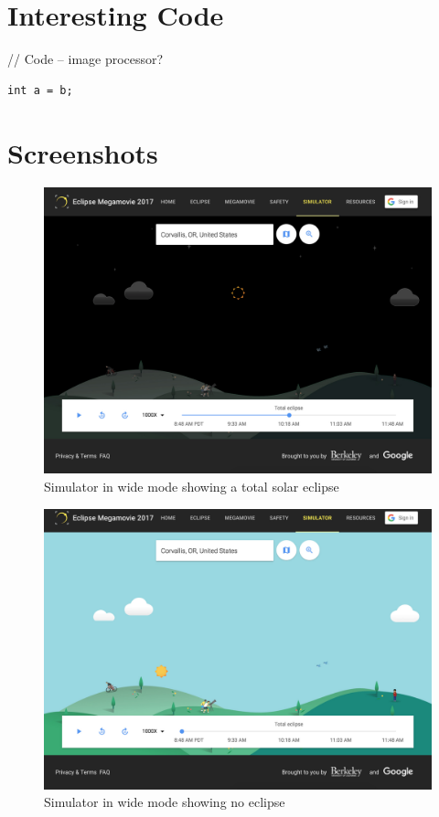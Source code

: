 \documentclass[10pt, onecolumn, draftclsnofoot, letterpaper, compsoc]{IEEEtran}
\begin{document}
\newpage
\section{Interesting Code}

// Code -- image processor?

\begin{verbatim}
int a = b;
\end{verbatim}

\newpage
\section{Screenshots}

\begin{figure}[!h]
	\begin{center}
  		\includegraphics[width=\textwidth]{sim_total.eps}
		\caption{Simulator in wide mode showing a total solar eclipse}
	\end{center}
\end{figure}
\newpage

\begin{figure}[!h]
	\begin{center}
			\includegraphics[width=\textwidth]{sim.eps}
		\caption{Simulator in wide mode showing no eclipse}
	\end{center}
\end{figure}
\newpage
\end{document}
